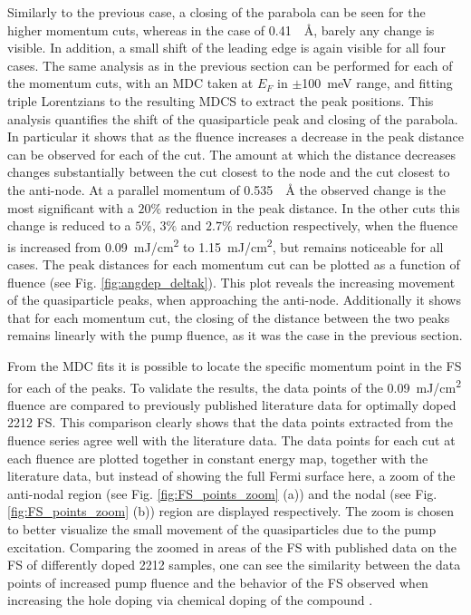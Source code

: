 Similarly to the previous case, a closing of the parabola can be seen for the higher momentum cuts, whereas in the case of \qty{0.41}{\per\angstrom}, barely any change is visible.
In addition, a small shift of the leading edge is again visible for all four cases.
The same analysis as in the previous section can be performed for each of the momentum cuts, with an MDC taken at $E_F$ in $\pm$\qty{100}{\milli\electronvolt} range, and fitting triple Lorentzians to the resulting MDCS to extract the peak positions.
This analysis quantifies the shift of the quasiparticle peak and closing of the parabola.
In particular it shows that as the fluence increases a decrease in the peak distance can be observed for each of the cut.
The amount at which the distance decreases changes substantially between the cut closest to the node and the cut closest to the anti-node.
At a parallel momentum of \qty{0.535}{\per\angstrom} the observed change is the most significant with a $20\%$ reduction in the peak distance.
In the other cuts this change is reduced to a $5\%$, $3\%$ and $2.7\%$ reduction respectively, when the fluence is increased from \qty{0.09}{\milli\joule/\centi\meter\squared} to \qty{1.15}{\milli\joule/\centi\meter\squared}, but remains noticeable for all cases.
The peak distances for each momentum cut can be plotted as a function of fluence (see Fig. \ref{fig:angdep_deltak}).
This plot reveals the increasing movement of the quasiparticle peaks, when approaching the anti-node.
Additionally it shows that for each momentum cut, the closing of the distance between the two peaks remains linearly with the pump fluence, as it was the case in the previous section.

From the MDC fits it is possible to locate the specific momentum point in the FS for each of the peaks.
To validate the results, the data points of the \qty{0.09}{\milli\joule/\centi\meter\squared} fluence are compared to previously published literature data for optimally doped 2212 FS.
This comparison clearly shows that the data points extracted from the fluence series agree well with the literature data.
The data points for each cut at each fluence are plotted together in constant energy map, together with the literature data, but instead of showing the full Fermi surface here, a zoom of the anti-nodal region (see Fig. \ref{fig:FS_points_zoom} (a)) and the nodal (see Fig. \ref{fig:FS_points_zoom} (b)) region are displayed respectively.
The zoom is chosen to better visualize the small movement of the quasiparticles due to the pump excitation.
Comparing the zoomed in areas of the FS with published data on the FS of differently doped 2212 samples, one can see the similarity between the data points of increased pump fluence and the behavior of the FS observed when increasing the hole doping via chemical doping of the compound \cite{drozdov_phase_2018}.

